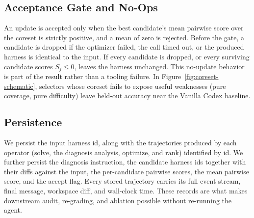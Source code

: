 \subsection{Acceptance Gate and No-Ops}

An update is accepted only when the best candidate's mean pairwise score over the coreset is strictly positive, and a mean of zero is rejected. Before the gate, a candidate is dropped if the optimizer failed, the call timed out, or the produced harness is identical to the input. If every candidate is dropped, or every surviving candidate scores $S_j \leq 0$, \method{} leaves the harness unchanged. This no-update behavior is part of the result rather than a tooling failure. In Figure~\ref{fig:coreset-schematic}, selectors whose coreset fails to expose useful weaknesses (pure coverage, pure difficulty) leave held-out accuracy near the Vanilla Codex baseline.

\subsection{Persistence}

We persist the input harness id, along with the trajectories produced by each operator ($\mathrm{solve}$, the diagnosis analysis, $\mathrm{optimize}$, and $\mathrm{rank}$) identified by id. We further persist the diagnosis instruction, the candidate harness ids together with their diffs against the input, the per-candidate pairwise scores, the mean pairwise score, and the accept flag. Every stored trajectory carries its full event stream, final message, workspace diff, and wall-clock time. These records are what makes downstream audit, re-grading, and ablation possible without re-running the agent.
